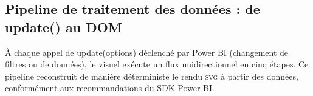 \subsection{Pipeline de traitement des données : de update() au DOM}
\label{subsec:4B-pipeline}

\setlength{\parindent}{0pt}

À chaque appel de update(options) déclenché par Power BI (changement de filtres ou de données), le visuel exécute un flux unidirectionnel en cinq étapes. Ce pipeline reconstruit de manière déterministe le rendu \textsc{svg} à partir des données, conformément aux recommandations du SDK Power BI.

